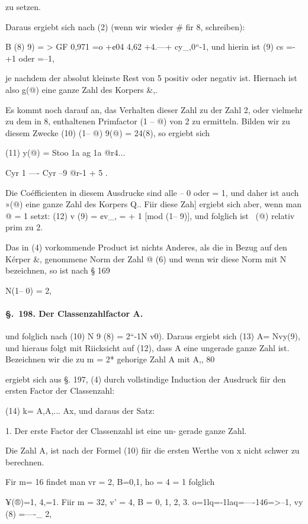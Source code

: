 \documentclass[12pt,a4paper]{article}
\theoremstyle{plain}
\theoremstyle{definition}
\begin{document}
zu setzen.

Daraus ergiebt sich nach (2) (wenn wir wieder \# fir 8, schreiben):

B (8) 9) = > GF 0,971 =o +¢04 4,62 +4.---+ cy\_,0``-1, und hierin ist (9) cs =-+1 oder =--1,

je nachdem der absolut kleinste Rest von 5 positiv oder negativ ist. Hiernach ist also g(@) eine ganze Zahl des Korpers \&,.

Es kommt noch darauf an, das Verhalten dieser Zahl zu der Zahl 2, oder vielmehr zu dem in 8, enthaltenen Primfactor (1 -- @) von 2 zu ermitteln. Bilden wir zu diesem Zwecke (10) (1-- @) 9(@) = 24(8), so ergiebt sich

(11) y(@) = Stoo 1a ag 1a @r4...

Cyr 1 ---- Cyr --9 @r-1 + 5 .

Die Coéfficienten in diesem Ausdrucke sind alle -- 0 oder = 1, und daher ist auch »(@) eine ganze Zahl des Korpers Q.. Fiir diese Zah] ergiebt sich aber, wenn man @ = 1 setzt: (12) v (9) = ¢v\_, = + 1 [mod (1-- 9)], und folglich ist ~(@) relativ prim zu 2.

Das in (4) vorkommende Product ist nichts Anderes, als die in Bezug auf den Kérper \&, genommene Norm der Zahl @ (6) und wenn wir diese Norm mit N bezeichnen, so ist nach § 169

N(1-- 0) = 2,

\paragraph{\S.~198. Der Classenzahlfactor A.}


und folglich nach (10) N 9 (8) = 2``-1N v0). Daraus ergiebt sich (13) A= Nvy(9), und hieraus folgt mit Riicksicht auf (12), dass A eine ungerade ganze Zahl ist. Bezeichnen wir die zu m = 2* gehorige Zahl A mit A,, 80

ergiebt sich aus §. 197, (4) durch vollstindige Induction der Ausdruck fiir den ersten Factor der Classenzahl:

(14) k= A,A,... Ax, und daraus der Satz:

1. Der erste Factor der Classenzahl ist eine un- gerade ganze Zahl.

Die Zahl A, ist nach der Formel (10) fiir die ersten Werthe von x nicht schwer zu berechnen.

Fir m= 16 findet man vr = 2, B=0,1, ho = 4 = 1 folglich

¥(®)=1, 4,=1. Fiir m = 32, v' = 4, B = 0, 1, 2, 3. o=1lq=-1laq=----146=>--1, vy (8) =----\_ 2,
\end{document}
